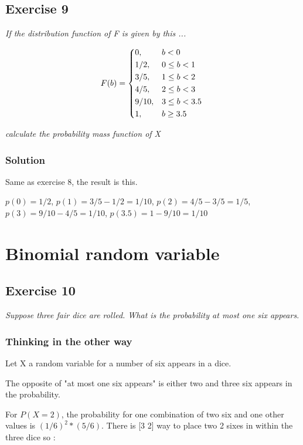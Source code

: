 \documentclass[12pt,a4paper]{article}
\begin{document}
\subsection{Exercise 9}

\textit{If the distribution function of F is given by this ...}

\[
F(b) = \begin{dcases*}
0, & $b < 0$ \\
1/2, & $0 \leq b < 1$ \\ 
3/5, & $1 \leq b < 2$ \\
4/5, & $2 \leq b < 3$ \\
9/10, & $3 \leq b < 3.5$ \\
1, & $b \geq 3.5$ \\
\end{dcases*}
\]

\textit{calculate the probability mass function of X}

\subsubsection{Solution}

Same as exercise 8, the result is this.

$p(0) = 1/2$,
$p(1) = 3/5 - 1/2 = 1/10$,
$p(2) = 4/5 - 3/5 = 1/5$,
$p(3) = 9/10 - 4/5 = 1/10$,
$p(3.5) = 1-9/10 = 1/10$

\section{Binomial random variable}
\subsection{Exercise 10}
\textit{Suppose three fair dice are rolled. What is the probability at most one six appears}.

\subsubsection{Thinking in the other way}

Let X a random variable for a number of six appears in a dice.

The opposite of "at most one six appears" is either two and three six appears in the probability.

For $P(X=2)$, the probability for one combination of two six and one other values is $(1/6)^2 * (5/6)$. There is [3 2] way to place two 2 sixes in within the three dice so :
\end{document}
